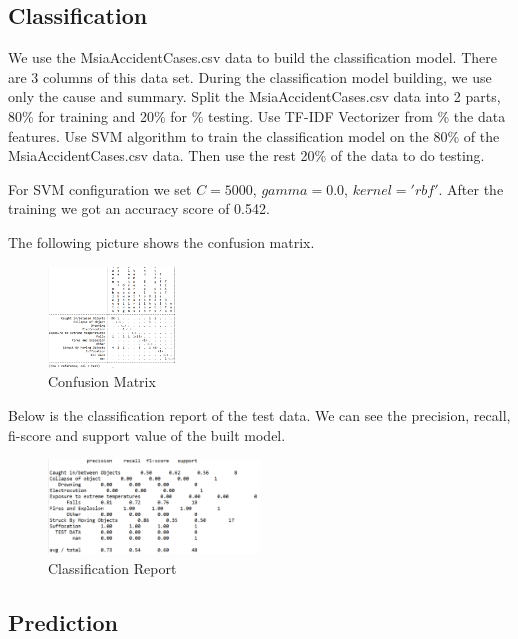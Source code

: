 \documentclass[DIV=calc, paper=a4, fontsize=11pt, twocolumn]{scrartcl}	 %
\begin{document}
\subsection{Classification}
\label{classification}

We use the MsiaAccidentCases.csv data to build the classification
model. There are 3 columns of this data set. During the classification
model building, we use only the cause and summary. Split the
MsiaAccidentCases.csv data into 2 parts, 80\% for training and 20\% for
                                \% testing. Use TF-IDF Vectorizer from
                                \% the data features.
Use SVM algorithm to train the classification model on the 80\% of the MsiaAccidentCases.csv data. Then use the rest 20\% of the data to do testing.


For SVM configuration we set $C = 5000$, $gamma = 0.0$, $kernel =
'rbf'$. After the training we got an accuracy score of 0.542.

The following picture shows the confusion matrix.

\begin{figure}[h!]
  \centering
      \includegraphics[width=0.3\textwidth]{confusion.png}
  \caption{Confusion Matrix}
\end{figure}

Below is the classification report of the test data. We can see the
precision, recall, fi-score and support value of the built model.


\begin{figure}[h!]
  \centering
      \includegraphics[width=0.5\textwidth]{class_report.png}
   \caption{Classification Report}
\end{figure}

\subsection{Prediction}
\end{document}
